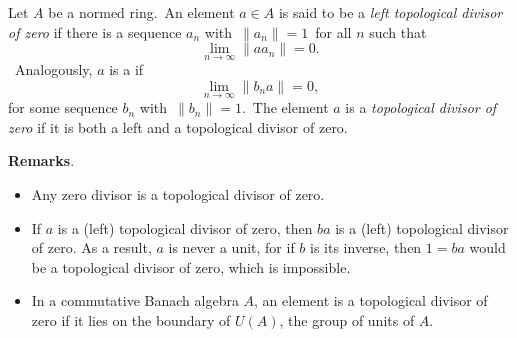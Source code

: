 \documentclass[12pt]{article}
\begin{document}
Let $A$ be a normed ring.\, An element $a\in A$ is said to be a \emph{left topological divisor of zero} if there is a sequence $a_n$ with\, $\|a_n\|=1$\, for all $n$ such that\, $$\lim_{n\to\infty}\|aa_n\| = 0.$$\, Analogously, $a$ is a  if\, $$\lim_{n\to\infty}\|b_na\| = 0,$$ for some sequence $b_n$ with\, $\|b_n\|=1$.\, The element $a$ is a \emph{topological divisor of zero} if it is both a left and a  topological divisor of zero.

\textbf{Remarks}.  
\begin{itemize}
\item Any zero divisor is a topological divisor of zero.
\item If $a$ is a (left) topological divisor of zero, then $ba$ is a (left) topological divisor of zero.  As a result, $a$ is never a unit, for if $b$ is its inverse, then $1=ba$ would be a topological divisor of zero, which is impossible.
\item In a commutative Banach algebra $A$, an element is a topological divisor of zero if it lies on the boundary of $U(A)$, the group of units of $A$.
\end{itemize}
\end{document}
